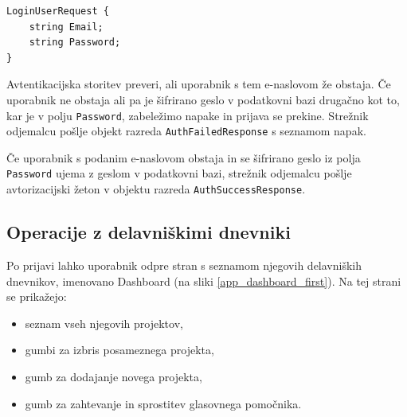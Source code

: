 \documentclass[a4paper, 12pt]{book}
\begin{document}
\begin{verbatim}
LoginUserRequest {
    string Email; 
    string Password; 
} 
\end{verbatim}

Avtentikacijska storitev preveri, ali uporabnik s tem e-naslovom že obstaja.
Če uporabnik ne obstaja ali pa je šifrirano geslo v podatkovni bazi drugačno kot to, kar je v polju \texttt{Password}, zabeležimo napake in prijava se prekine.
Strežnik odjemalcu pošlje objekt razreda \texttt{AuthFailedResponse} s seznamom napak.

Če uporabnik s podanim e-naslovom obstaja in se šifrirano geslo iz polja \texttt{Password} ujema z geslom v podatkovni bazi, strežnik odjemalcu pošlje avtorizacijski žeton v objektu razreda \texttt{AuthSuccessResponse}.




\subsection{Operacije z delavniškimi dnevniki}

Po prijavi lahko uporabnik odpre stran s seznamom njegovih delavniških dnevnikov, imenovano Dashboard (na sliki \ref{app_dashboard_first}).
Na tej strani se prikažejo:
\begin{itemize}
	\item seznam vseh njegovih projektov, 
	\item gumbi za izbris posameznega projekta,
	\item gumb za dodajanje novega projekta, 
	\item gumb za zahtevanje in sprostitev glasovnega pomočnika.
\end{itemize}


\clearpage
\end{document}

